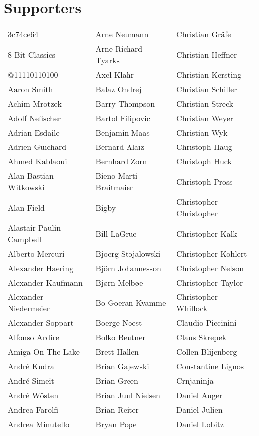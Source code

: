 \newpage
\section{Supporters}

\begin{small}
\setlength{\tabcolsep}{1mm}
\begin{tabular}{p{4cm}p{4cm}p{4cm}}
3c74ce64 & Arne Neumann & Christian Gräfe \\
8-Bit Classics & Arne Richard Tyarks & Christian Heffner \\
@11110110100 & Axel Klahr & Christian Kersting \\
Aaron Smith & Balaz Ondrej & Christian Schiller \\
Achim Mrotzek & Barry Thompson & Christian Streck \\
Adolf Nefischer & Bartol Filipovic & Christian Weyer \\
Adrian Esdaile & Benjamin Maas & Christian Wyk \\
Adrien Guichard & Bernard Alaiz & Christoph Haug \\
Ahmed Kablaoui & Bernhard Zorn & Christoph Huck \\
Alan Bastian Witkowski & Bieno Marti-Braitmaier & Christoph Pross \\
Alan Field & Bigby & Christopher Christopher \\
Alastair Paulin-Campbell & Bill LaGrue & Christopher Kalk \\
Alberto Mercuri & Bjoerg Stojalowski & Christopher Kohlert \\
Alexander Haering & Björn Johannesson & Christopher Nelson \\
Alexander Kaufmann & Bjørn Melbøe & Christopher Taylor \\
Alexander Niedermeier & Bo Goeran Kvamme & Christopher Whillock \\
Alexander Soppart & Boerge Noest & Claudio Piccinini \\
Alfonso Ardire & Bolko Beutner & Claus Skrepek \\
Amiga On The Lake & Brett Hallen & Collen Blijenberg \\
André Kudra & Brian Gajewski & Constantine Lignos \\
André Simeit & Brian Green & Crnjaninja \\
André Wösten & Brian Juul Nielsen & Daniel Auger \\
Andrea Farolfi & Brian Reiter & Daniel Julien \\
Andrea Minutello & Bryan Pope & Daniel Lobitz \\

\end{tabular}
\end{small}
